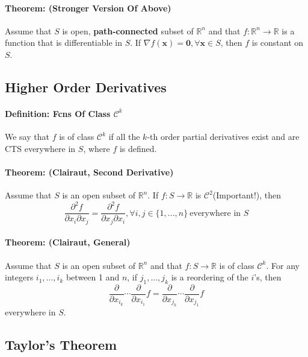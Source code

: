 \documentclass[12pt]{article}
\newcommand{\real}{\mathbb{R}}
\newcommand{\vx}{\mathbf{x}}
\newcommand{\vzero}{\mathbf{0}}
\begin{document}
\paragraph{Theorem: (Stronger Version Of Above)} Assume that $S$ is open, \textbf{path-connected} subset of $\real^n$ and that $f:\real^n \to \real$ is a function that is differentiable in $S$. If $\nabla f(\vx) = \vzero, \forall \vx\in S$, then $f$ is constant on $S$.

\subsection{Higher Order Derivatives}
\paragraph{Definition: Fcns Of Class $\mathcal{C}^k$} We say that $f$ is of class $\mathcal{C}^k$ if all the $k$-th order partial derivatives exist and are CTS everywhere in $S$, where $f$ is defined.

\paragraph{Theorem: (Clairaut, Second Derivative)} Assume that $S$ is an open subset of $\real^n$. If $f:S\to \real$ is $\mathcal{C}^2$(Important!), then
\begin{equation*}
    \frac{\partial^2f}{\partial x_i \partial x_j} = \frac{\partial^2f}{\partial x_j \partial x_i}, \forall i, j \in \{ 1,...,n \}~\text{everywhere in $S$}
\end{equation*}

\paragraph{Theorem: (Clairaut, General)} Assume that $S$ is an open subset of $\real^n$ and that $f:S\to \real$ is of class $\mathcal{C}^k$. For any integers $i_1,...,i_k$ between 1 and $n$, if $j_1,...,j_k$ is a reordering of the $i$'s, then
\begin{equation*}
    \frac{\partial}{\partial x_{i_k} }\cdots\frac{\partial}{\partial x_{i_1} }f= \frac{\partial}{\partial x_{j_k} }\cdots\frac{\partial}{\partial x_{j_1} }f
\end{equation*}
everywhere in $S$.

\subsection{Taylor's Theorem}
\end{document}

